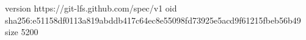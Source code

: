 version https://git-lfs.github.com/spec/v1
oid sha256:e51158df0113a819abddb417c64ec8e55098fd73925e5acd9f61215fbeb56b49
size 5200
